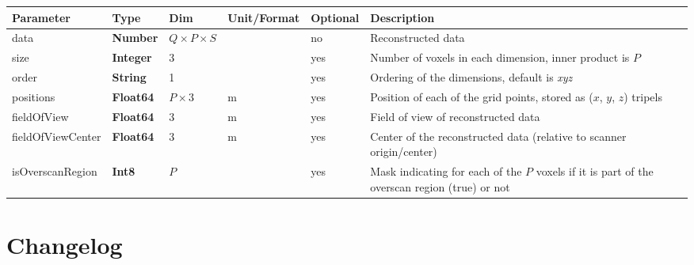 \documentclass[landscape,a4paper]{article} %
\newcommand{\inltab}[1]{{\ttfamily\bfseries\color{blue}#1}}
\newcommand{\inlvar}[1]{{\ttfamily#1}}
\begin{document}
\noindent \begin{tabularx}{\columnwidth}{lllllX} 
\textbf{Parameter} & \textbf{Type} & \textbf{Dim} & \textbf{Unit/Format} & \textbf{Optional} & \textbf{Description} \\ \hline 
\inlvar{data} & \inltab{Number} & $Q\times P \times S$ & & no & Reconstructed data \\ \hline
\inlvar{size} & \inltab{Integer} & $3$ &  & yes & Number of voxels in each dimension, inner product is $P$ \\ \hline
\inlvar{order} & \inltab{String} & 1 & & yes & Ordering of the dimensions, default is \textit{xyz} \\ \hline
\inlvar{positions} & \inltab{Float64} & $P \times 3$ & m & yes & Position of each of the grid points, stored as ($x$, $y$, $z$) tripels \\ \hline
\inlvar{fieldOfView} & \inltab{Float64} & $3$ & m & yes & Field of view of reconstructed data \\ \hline
\inlvar{fieldOfViewCenter} & \inltab{Float64} & $3$ & m & yes & Center of the reconstructed data (relative to scanner origin/center) \\ \hline 
\inlvar{isOverscanRegion} & \inltab{Int8} & $P$ &  & yes & Mask indicating for each of the $P$ voxels if it is part of the overscan region (true) or not \\ \hline
\end{tabularx}


\clearpage
\section{Changelog}
\end{document}
